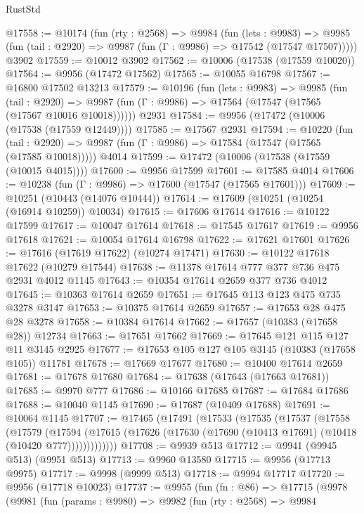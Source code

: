 \begin{lexlean}{RustStd}
\begin{coremodule}
@17558 := @10174
    (fun (rty : @2568) =>
    @9984
      (fun (lets : @9983) =>
      @9985 (fun (tail : @2920) => @9987 (fun (Γ : @9986) => @17542 (@17547 @17507)))))
    @3902
@17559 := @10012 @3902
@17562 := @10006 (@17538 (@17559 @10020))
@17564 := @9956 (@17472 @17562)
@17565 := @10055 @16798
@17567 := @16800 @17502 @13213
@17579 := @10196
    (fun (lets : @9983) =>
    @9985
      (fun (tail : @2920) =>
      @9987 (fun (Γ : @9986) => @17564 (@17547 (@17565 (@17567 @10016 @10018))))))
    @2931
@17584 := @9956 (@17472 (@10006 (@17538 (@17559 @12449))))
@17585 := @17567 @2931
@17594 := @10220
    (fun (tail : @2920) => @9987 (fun (Γ : @9986) => @17584 (@17547 (@17565 (@17585 @10018)))))
    @4014
@17599 := @17472 (@10006 (@17538 (@17559 (@10015 @4015))))
@17600 := @9956 @17599
@17601 := @17585 @4014
@17606 := @10238 (fun (Γ : @9986) => @17600 (@17547 (@17565 @17601)))
@17609 := @10251 (@10443 (@14076 @10444))
@17614 := @17609 (@10251 (@10254 (@16914 @10259)) @10034)
@17615 := @17606 @17614
@17616 := @10122 @17599
@17617 := @10047 @17614
@17618 := @17545 @17617
@17619 := @9956 @17618
@17621 := @10054 @17614 @16798
@17622 := @17621 @17601
@17626 := @17616 (@17619 @17622) (@10274 @17471)
@17630 := @10122 @17618 @17622 (@10279 @17544)
@17638 := @11378 @17614 @777 @377 @736 @475 @2931 @4012 @1145
@17643 := @10354 @17614 @2659 @377 @736 @4012
@17645 := @10363 @17614 @2659
@17651 := @17645 @113 @123 @475 @735 @3278 @3147
@17653 := @10375 @17614 @2659
@17657 := @17653 @28 @475 @28 @3278
@17658 := @10384 @17614
@17662 := @17657 (@10383 (@17658 @28)) @12734
@17663 := @17651 @17662
@17669 := @17645 @121 @115 @127 @11 @3145 @2925
@17677 := @17653 @105 @127 @105 @3145 (@10383 (@17658 @105)) @11781
@17678 := @17669 @17677
@17680 := @10400 @17614 @2659
@17681 := @17678 @17680
@17684 := @17638 (@17643 (@17663 @17681))
@17685 := @9970 @777
@17686 := @10166 @17685
@17687 := @17684 @17686
@17688 := @10040 @1145
@17690 := @17687 (@10409 @17688)
@17691 := @10064 @1145
@17707 := @17465
    (@17491
      (@17533
        (@17535
          (@17537
            (@17558
              (@17579
                (@17594
                  (@17615 (@17626 (@17630 (@17690 (@10413 @17691) (@10418 (@10420 @777)))))))))))))
@17708 := @9939 @513
@17712 := @9941 (@9945 @513) (@9951 @513)
@17713 := @9960 @13580
@17715 := @9956 (@17713 @9975)
@17717 := @9998 (@9999 @513)
@17718 := @9994 @17717
@17720 := @9956 (@17718 @10023)
@17737 := @9955
    (fun (fn : @86) =>
    @17715
      (@9978
        (@9981
          (fun (params : @9980) =>
          @9982
            (fun (rty : @2568) =>
            @9984

\end{coremodule}
\end{lexlean}

